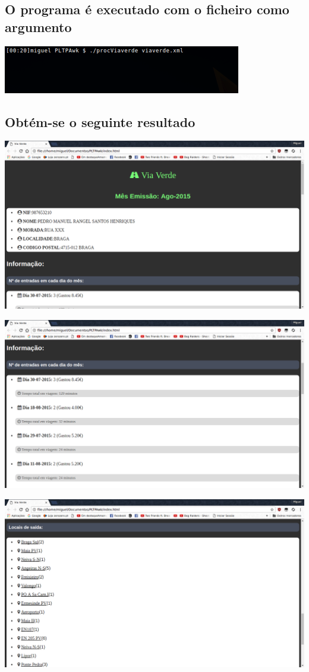 \documentclass{report}
\begin{document}
\subsection{O programa é executado com o ficheiro como argumento}

\includegraphics{in.png}

\subsection{Obtém-se o seguinte resultado}

\includegraphics[scale=0.35]{out1.png}\par
\includegraphics[scale=0.35]{out2.png}\par
\includegraphics[scale=0.35]{out3.png}\par
\end{document}
